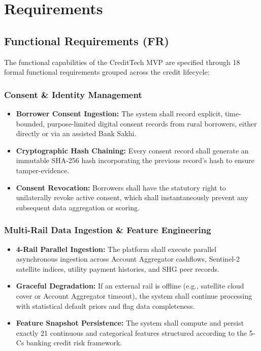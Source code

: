 \chapter{Requirements}
\label{chap:requirements}

\section{Functional Requirements (FR)}
The functional capabilities of the CreditTech MVP are specified through 18 formal functional requirements grouped across the credit lifecycle:

\subsection{Consent \& Identity Management}
\begin{itemize}[leftmargin=2em, label=\textbf{FR-\arabic*.}]
  \item \textbf{Borrower Consent Ingestion:} The system shall record explicit, time-bounded, purpose-limited digital consent records from rural borrowers, either directly or via an assisted Bank Sakhi.
  \item \textbf{Cryptographic Hash Chaining:} Every consent record shall generate an immutable SHA-256 hash incorporating the previous record's hash to ensure tamper-evidence.
  \item \textbf{Consent Revocation:} Borrowers shall have the statutory right to unilaterally revoke active consent, which shall instantaneously prevent any subsequent data aggregation or scoring.
\end{itemize}

\subsection{Multi-Rail Data Ingestion \& Feature Engineering}
\begin{itemize}[leftmargin=2em, label=\textbf{FR-\arabic*.}]
  \setcounter{enumi}{3}
  \item \textbf{4-Rail Parallel Ingestion:} The platform shall execute parallel asynchronous ingestion across Account Aggregator cashflows, Sentinel-2 satellite indices, utility payment histories, and SHG peer records.
  \item \textbf{Graceful Degradation:} If an external rail is offline (e.g., satellite cloud cover or Account Aggregator timeout), the system shall continue processing with statistical default priors and flag data completeness.
  \item \textbf{Feature Snapshot Persistence:} The system shall compute and persist exactly 21 continuous and categorical features structured according to the 5-Cs banking credit risk framework.
\end{itemize}

